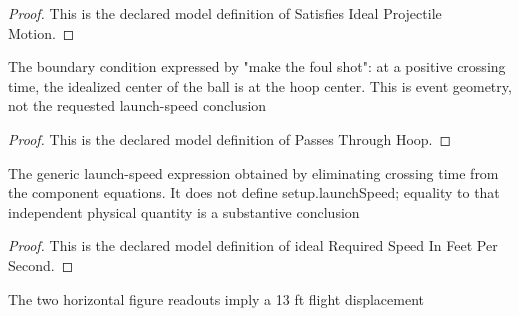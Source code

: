 \begin{proof}
  This is the declared model definition of Satisfies Ideal Projectile Motion.
\end{proof}
\begin{definition}
  \label{def:physics:phyx-mini-0751:phyxminiproblems-problemphyxmini0751-passesthroughhoop}
  The boundary condition expressed by "make the foul shot": at a positive crossing time, the idealized center of the ball is at the hoop center. This is event geometry, not the requested launch-speed conclusion
\end{definition}
\begin{proof}
  This is the declared model definition of Passes Through Hoop.
\end{proof}
\begin{definition}
  \label{def:physics:phyx-mini-0751:phyxminiproblems-problemphyxmini0751-idealrequiredspeedinfeetpersecond}
  The generic launch-speed expression obtained by eliminating crossing time from the component equations. It does not define setup.launchSpeed; equality to that independent physical quantity is a substantive conclusion
\end{definition}
\begin{proof}
  This is the declared model definition of ideal Required Speed In Feet Per Second.
\end{proof}
\begin{lemma}
  \label{lem:physics:phyx-mini-0751:phyxminiproblems-problemphyxmini0751-releasetohoophorizontaldistanceinfeet-eq}
  The two horizontal figure readouts imply a 13 ft flight displacement
\end{lemma}
